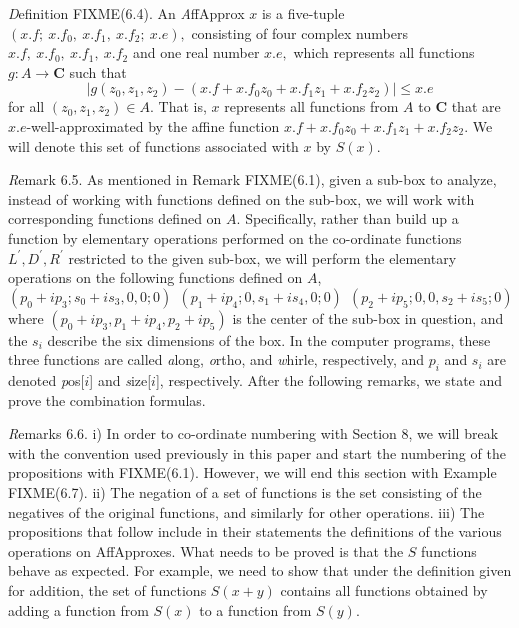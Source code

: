  {\textit Definition {\textrm FIXME(6.4)}}.  An {\textit AffApprox}  $x$ is a five-tuple
$(x.f;\ x.f_0,\ x.f_1,\ x.f_2;\ x.e),$
consisting of four complex numbers $x.f,\ x.f_0,\ x.f_1,\ x.f_2$ and one real number $x.e,$  which represents all functions 
$g: A \rightarrow {\mathbf C}$ such that
$$|g(z_0,z_1,z_2) - (x.f + x.f_0 z_0 + x.f_1 z_1 + x.f _2 z_2)| \le x.e$$
for all $(z_0,z_1,z_2) \in A.$  That is, $x$ represents all functions from $A$ to ${\mathbf C}$ that are $x.e$-well-approximated by the affine function $x.f + x.f_0 z_0 + x.f_1 z_1 + x.f _2 z_2$.  We will denote this set of functions associated with $x$ by $S(x)$.

{\textit Remark} 6.5.
As mentioned in Remark FIXME(6.1), given a sub-box to analyze, instead of working with functions defined on the sub-box, we will work with corresponding functions defined on $A.$  Specifically, rather than build up a function by elementary operations performed on the co-ordinate functions 
$L^{\prime}, D^{\prime}, R^{\prime}$ 
restricted to the given sub-box, we will perform the elementary operations on the following functions defined on $A$, 
$$(p_0 + i p_3; s_0 + i s_3,0,0; 0)\  \ (p_1 + i p_4; 0, s_1 + i s_4,0;0) \   \ (p_2 + i p_5; 0,0, s_2 + i s_5; 0)$$
where $(p_0 + i p_3, p_1 + i p_4, p_2 + i p_5)$ is the center of the sub-box in question, and the $s_i$ describe the six dimensions of the box. In the computer programs, these three functions are called {\textit along}, {\textit ortho}, and {\textit whirle,} respectively, and $p_i$ and $s_i$
 are denoted {\textit pos}[$i$] and {\textit size}[$i$], respectively.
After the following remarks, we state and prove the combination formulas. 

 {\textit Remarks} 6.6.
i) In order to co-ordinate numbering with Section 8, we will break with the convention used previously in this paper and start the
numbering of the propositions with FIXME(6.1). However, we will end this section with Example FIXME(6.7).
ii)  The negation of a set of functions is the set consisting of the negatives of the original functions, and similarly for other operations.
iii)  The propositions that follow include in their statements the definitions of the various operations on AffApproxes.  What needs to
be proved is that the $S$ functions behave as expected.  For example, we need to show that under the definition given for addition, the
set of functions $S(x+y)$ contains all functions obtained by adding a function from $S(x)$ to a function from $S(y).$

